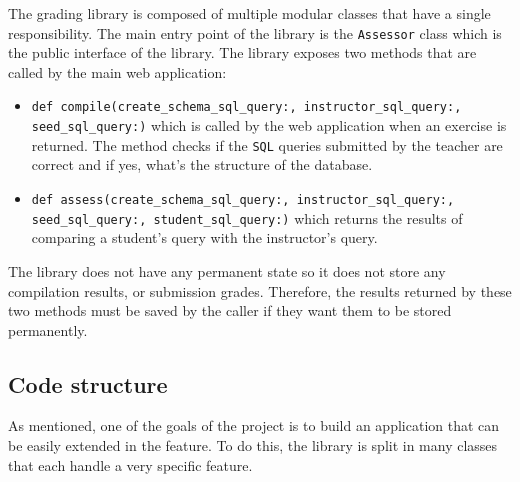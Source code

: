 The grading library is composed of multiple modular classes that have a single responsibility. The main entry point of the library is the \texttt{Assessor} class which is the public interface of the library. The library exposes two methods that are called by the main web application:

\begin{itemize}
    \item \texttt{def compile(create_schema_sql_query:, instructor_sql_query:, seed_sql_query:)} which is called by the web application when an exercise is returned. The method checks if the \texttt{SQL} queries submitted by the teacher are correct and if yes, what's the structure of the database.
    \item \texttt{def assess(create_schema_sql_query:, instructor_sql_query:, seed_sql_query:, student_sql_query:)} which returns the results of comparing a student's query with the instructor's query.
\end{itemize}

The library does not have any permanent state so it does not store any compilation results, or submission grades. Therefore, the results returned by these two methods must be saved by the caller if they want them to be stored permanently.

\subsection{Code structure}

As mentioned, one of the goals of the project is to build an application that can be easily extended in the feature. To do this, the library is split in many classes that each handle a very specific feature.

